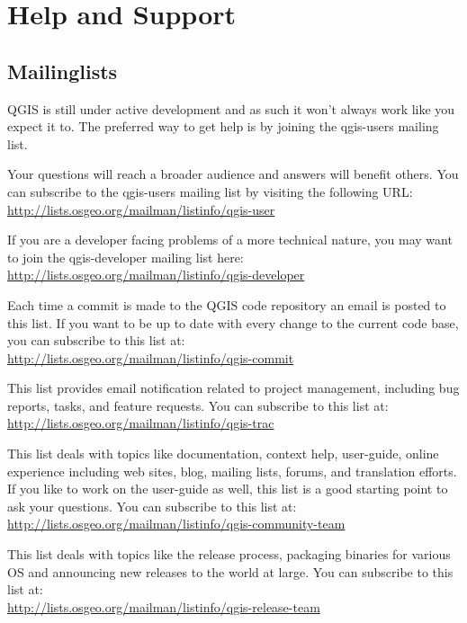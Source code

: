 \section{Help and Support}\label{label_helpsupport}

\subsection{Mailinglists}
QGIS is still under active development and as such it won't always work like
you expect it to. The preferred way to get help is by joining the qgis-users
mailing list. 

Your questions will reach a broader audience and answers will
benefit others. You can subscribe to the qgis-users mailing list by visiting
the following URL: \\
\url{http://lists.osgeo.org/mailman/listinfo/qgis-user}

If you are a developer facing problems of a more technical nature, you may
want to join the qgis-developer mailing list here:\\
\url{http://lists.osgeo.org/mailman/listinfo/qgis-developer}

Each time a commit is made to the QGIS code repository an email is posted to
this list. If you want to be up to date with every change to the current code
base, you can subscribe to this list at:\\
\url{http://lists.osgeo.org/mailman/listinfo/qgis-commit}

This list provides email notification related to project management,
including bug reports, tasks, and feature requests. You can subscribe to this
list at:\\
\url{http://lists.osgeo.org/mailman/listinfo/qgis-trac}

This list deals with topics like documentation, context help, user-guide,
online experience including web sites, blog, mailing lists, forums, and
translation efforts. If you like to work on the user-guide as well, this list
is a good starting point to ask your questions. You can subscribe to this
list at:\\
\url{http://lists.osgeo.org/mailman/listinfo/qgis-community-team}

This list deals with topics like the release process, packaging binaries for
various OS and announcing new releases to the world at large. You can
subscribe to this list at:\\
\url{http://lists.osgeo.org/mailman/listinfo/qgis-release-team}


